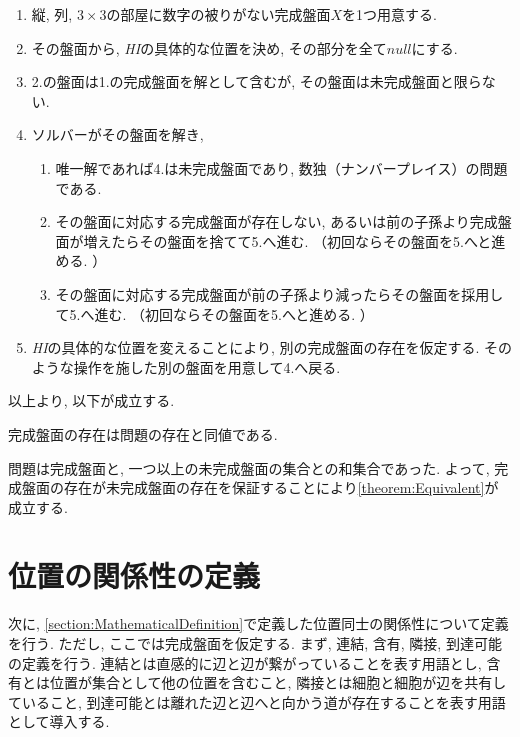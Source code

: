 \begin{example}[遺伝的アルゴリズム]\label{example:GenericAlgorithm}
  \begin{enumerate}
    \item 縦, 列, $3\times3$の部屋に数字の被りがない完成盤面$X$を1つ用意する.
    \item その盤面から, \textit{HI}の具体的な位置を決め, その部分を全て$null$にする.
    \item 2.の盤面は1.の完成盤面を解として含むが, その盤面は未完成盤面と限らない.
    \item ソルバーがその盤面を解き,
          \begin{enumerate}
            \item 唯一解であれば4.は未完成盤面であり, 数独（ナンバープレイス）の問題である.
            \item その盤面に対応する完成盤面が存在しない, あるいは前の子孫より完成盤面が増えたらその盤面を捨てて5.へ進む. （初回ならその盤面を5.へと進める. ）
            \item その盤面に対応する完成盤面が前の子孫より減ったらその盤面を採用して5.へ進む. （初回ならその盤面を5.へと進める. ）
          \end{enumerate}
    \item \textit{HI}の具体的な位置を変えることにより, 別の完成盤面の存在を仮定する. そのような操作を施した別の盤面を用意して4.へ戻る.
  \end{enumerate}
\end{example}

以上より, 以下が成立する.
\begin{theorem}\label{theorem:Equivalent}
  完成盤面の存在は問題の存在と同値である.
\end{theorem}
問題は完成盤面と, 一つ以上の未完成盤面の集合との和集合であった. よって, 完成盤面の存在が未完成盤面の存在を保証することにより\cref{theorem:Equivalent}が成立する.






\section{位置の関係性の定義}\label{section:RelationDefinition}

次に, \cref{section:MathematicalDefinition}で定義した位置同士の関係性について定義を行う. ただし, ここでは完成盤面を仮定する.
まず, 連結, 含有, 隣接, 到達可能の定義を行う.
連結とは直感的に辺と辺が繋がっていることを表す用語とし, 含有とは位置が集合として他の位置を含むこと, 隣接とは細胞と細胞が辺を共有していること, 到達可能とは離れた辺と辺へと向かう道が存在することを表す用語として導入する.


